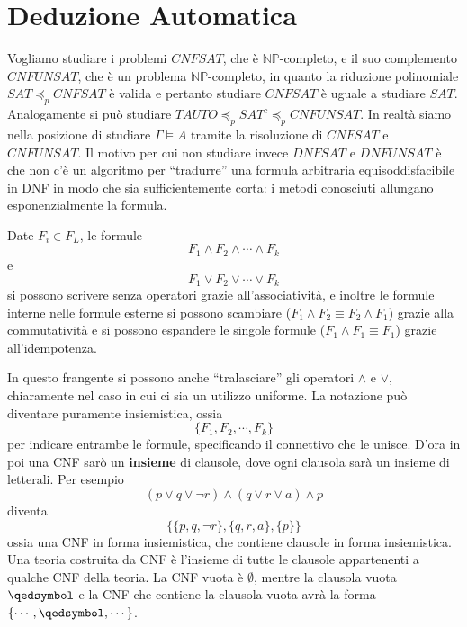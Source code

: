 \section{Deduzione Automatica}
Vogliamo studiare i problemi $CNFSAT$, che è $\mathbb{NP}$-completo, e 
il suo complemento $CNFUNSAT$, che è un problema $\mathbb{NP}$-completo, 
in quanto la riduzione polinomiale $SAT \preceq_p CNFSAT$ è valida e pertanto 
studiare $CNFSAT$ è uguale a studiare $SAT$. Analogamente si può studiare 
$TAUTO \preceq_p SAT^c \preceq_p CNFUNSAT$. In realtà siamo nella posizione 
di studiare $\Gamma \models A$ tramite la risoluzione di $CNFSAT$ e $CNFUNSAT$.
Il motivo per cui non studiare invece $DNFSAT$ e $DNFUNSAT$ è che non 
c'è un algoritmo per ``tradurre'' una formula arbitraria equisoddisfacibile 
in DNF in modo che sia sufficientemente corta: i metodi conosciuti allungano
esponenzialmente la formula. 

\begin{defi}
        Date $F_i \in F_L$, le formule 
        $$
        F_1 \land F_2 \land \cdots \land F_k
        $$
        e 
        $$
        F_1 \lor F_2 \lor \cdots \lor F_k
        $$
        si possono scrivere senza operatori grazie all'associatività, 
        e inoltre le formule interne nelle formule esterne si possono 
        scambiare ($F_1 \land F_2 \equiv F_2 \land F_1$) grazie 
        alla commutatività e si possono espandere le singole formule 
        ($F_1 \land F_1  \equiv F_1$) grazie all'idempotenza. 

        In questo frangente si possono anche ``tralasciare'' gli operatori 
        $\land$ e $\lor$, chiaramente nel caso in cui ci sia un utilizzo uniforme. 
        La notazione può diventare puramente insiemistica, ossia 
        $$
        \{F_1, F_2, \cdots, F_k\}
        $$
        per indicare entrambe le formule, specificando il connettivo che le 
        unisce. D'ora in poi una CNF sarò un \textbf{insieme} di clausole, 
        dove ogni clausola sarà un insieme di letterali. 
        Per esempio 
        $$
        (p \lor q \lor \neg r) \land (q \lor r \lor a) \land p
        $$
        diventa 
        $$
        \{ \{p, q, \neg r\}, \{q, r, a\}, \{p\}\}
        $$
        ossia una CNF in forma insiemistica, che contiene clausole in 
        forma insiemistica. 
        Una teoria costruita da CNF è l'insieme di tutte le clausole appartenenti 
        a qualche CNF della teoria. 
        La CNF vuota è $\emptyset$, mentre la clausola vuota $\qedsymbol$ 
        e la CNF che contiene la clausola vuota avrà la forma 
        $\{\cdots, \qedsymbol, \cdots \}$.
\end{defi}

